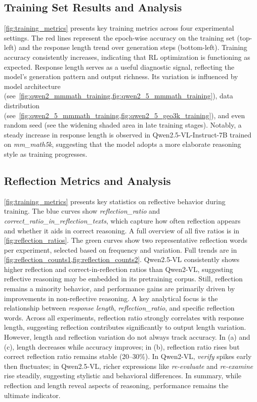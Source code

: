 \documentclass{article} %
\begin{document}
\subsection{Training Set Results and Analysis}
\label{sec:training_results}
\cref{fig:training_metrics}
presents key training metrics across four experimental settings. The red lines represent the epoch-wise accuracy on the training set (top-left) and the response length trend over generation steps (bottom-left).
%
Training accuracy consistently increases, indicating that RL optimization is functioning as expected.
%
Response length serves as a useful diagnostic signal, reflecting the model’s generation pattern and output richness. Its variation is influenced by model architecture (see~\cref{fig:qwen2_mmmath_training,fig:qwen2_5_mmmath_training}), data distribution (see~\cref{fig:qwen2_5_mmmath_training,fig:qwen2_5_geo3k_training}), and even random seed (see the widening shaded area in late training stages).
%
Notably, a steady increase in response length is observed in Qwen2.5-VL-Instruct-7B trained on \textit{mm\_math5k}, suggesting that the model adopts a more elaborate reasoning style as training progresses.

\subsection{Reflection Metrics and Analysis}
\label{sec:reflection_results}
\cref{fig:training_metrics} presents key statistics on reflective behavior during training. The blue curves show \textit{reflection\_ratio} and \textit{correct\_ratio\_in\_reflection\_texts}, which capture how often reflection appears and whether it aids in correct reasoning. A full overview of all five ratios is in \cref{fig:reflection_ratios}.
%
The green curves show two representative reflection words per experiment, selected based on frequency and variation. Full trends are in \cref{fig:reflection_counts1,fig:reflection_counts2}.
%
Qwen2.5-VL consistently shows higher reflection and correct-in-reflection ratios than Qwen2-VL, suggesting reflective reasoning may be embedded in its pretraining corpus.
%
Still, reflection remains a minority behavior, and performance gains are primarily driven by improvements in non-reflective reasoning.
%
A key analytical focus is the relationship between \textit{response length}, \textit{reflection\_ratio}, and specific reflection words. Across all experiments, reflection ratio strongly correlates with response length, suggesting reflection contributes significantly to output length variation.
%
However, length and reflection variation do not always track accuracy. In (a) and (c), length decreases while accuracy improves; in (b), reflection ratio rises but correct reflection ratio remains stable (20–30\%).
%
In Qwen2-VL, \textit{verify} spikes early then fluctuates; in Qwen2.5-VL, richer expressions like \textit{re-evaluate} and \textit{re-examine} rise steadily, suggesting stylistic and behavioral differences.
%
In summary, while reflection and length reveal aspects of reasoning, performance remains the ultimate indicator.
%
\end{document}

